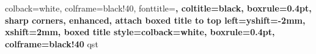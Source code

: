 \newcommand{\lecture}[2]{%
	\clearpage
	\refstepcounter{lecture} %

	\section*{\xcharter Les \thelecture: #1 \\ \small #2}%
	\addcontentsline{toc}{section}{Les \thelecture: #1 (#2)}%

	\setcounter{section}{0}%
	\setcounter{subsection}{0}%
	\setcounter{subsubsection}{0}%
}

\renewcommand{\theassignment}{\ifnum\value{assignment}<10 0\fi\arabic{assignment}}

\newcommand{\assignment}[2]{%
	\newpage
	\refstepcounter{assignment} %

	\section*{\xcharter Ass \theassignment: #1 \\ \small #2}%
	\addcontentsline{toc}{section}{Ass \theassignment: #1 (#2)}%

	\setcounter{section}{0}%
	\setcounter{subsection}{0}%
	\setcounter{subsubsection}{0}%
	\setcounter{question}{0}
}

%
{colback=white,
	colframe=black!40,
	fonttitle=\bfseries,
	coltitle=black,
	boxrule=0.4pt,
	sharp corners,
	enhanced,
	attach boxed title to top left={yshift=-2mm, xshift=2mm},
	boxed title style={colback=white, boxrule=0.4pt, colframe=black!40}}%
{qst}

\setlength{\parskip}{3pt} %
\setlength{\parindent}{0pt} %

\makeatletter
\renewcommand\paragraph{\@startsection{paragraph}{4}{\z@}%
	{3.25ex \@plus1ex \@minus.2ex}%
	{-1em}%
	{\normalfont\normalsize\fontseries{b}\selectfont\underline}}
\makeatother

